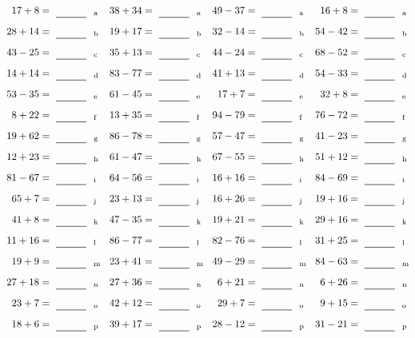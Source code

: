 \documentclass
[
  draft    = true,
  fontsize = 11pt,
  parskip  = half-
]
{scrartcl}
\begin{document}
\clearpage
\begin{align*}
    \pline{17+8}&=\rline{a}
  & \pline{38+34}&=\rline{a}
  & \pline{49-37}&=\rline{a}
  & \pline{16+8}&=\rline{a} \\[1ex]
    \pline{28+14}&=\rline{b}
  & \pline{19+17}&=\rline{b}
  & \pline{32-14}&=\rline{b}
  & \pline{54-42}&=\rline{b} \\[1ex]
    \pline{43-25}&=\rline{c}
  & \pline{35+13}&=\rline{c}
  & \pline{44-24}&=\rline{c}
  & \pline{68-52}&=\rline{c} \\[1ex]
    \pline{14+14}&=\rline{d}
  & \pline{83-77}&=\rline{d}
  & \pline{41+13}&=\rline{d}
  & \pline{54-33}&=\rline{d} \\[1ex]
    \pline{53-35}&=\rline{e}
  & \pline{61-45}&=\rline{e}
  & \pline{17+7}&=\rline{e}
  & \pline{32+8}&=\rline{e} \\[1ex]
    \pline{8+22}&=\rline{f}
  & \pline{13+35}&=\rline{f}
  & \pline{94-79}&=\rline{f}
  & \pline{76-72}&=\rline{f} \\[1ex]
    \pline{19+62}&=\rline{g}
  & \pline{86-78}&=\rline{g}
  & \pline{57-47}&=\rline{g}
  & \pline{41-23}&=\rline{g} \\[1ex]
    \pline{12+23}&=\rline{h}
  & \pline{61-47}&=\rline{h}
  & \pline{67-55}&=\rline{h}
  & \pline{51+12}&=\rline{h} \\[1ex]
    \pline{81-67}&=\rline{i}
  & \pline{64-56}&=\rline{i}
  & \pline{16+16}&=\rline{i}
  & \pline{84-69}&=\rline{i} \\[1ex]
    \pline{65+7}&=\rline{j}
  & \pline{23+13}&=\rline{j}
  & \pline{16+26}&=\rline{j}
  & \pline{19+16}&=\rline{j} \\[1ex]
    \pline{41+8}&=\rline{k}
  & \pline{47-35}&=\rline{k}
  & \pline{19+21}&=\rline{k}
  & \pline{29+16}&=\rline{k} \\[1ex]
    \pline{11+16}&=\rline{l}
  & \pline{86-77}&=\rline{l}
  & \pline{82-76}&=\rline{l}
  & \pline{31+25}&=\rline{l} \\[1ex]
    \pline{19+9}&=\rline{m}
  & \pline{23+41}&=\rline{m}
  & \pline{49-29}&=\rline{m}
  & \pline{84-63}&=\rline{m} \\[1ex]
    \pline{27+18}&=\rline{n}
  & \pline{27+36}&=\rline{n}
  & \pline{6+21}&=\rline{n}
  & \pline{6+26}&=\rline{n} \\[1ex]
    \pline{23+7}&=\rline{o}
  & \pline{42+12}&=\rline{o}
  & \pline{29+7}&=\rline{o}
  & \pline{9+15}&=\rline{o} \\[1ex]
    \pline{18+6}&=\rline{p}
  & \pline{39+17}&=\rline{p}
  & \pline{28-12}&=\rline{p}
  & \pline{31-21}&=\rline{p}
\end{align*}
\end{document}

